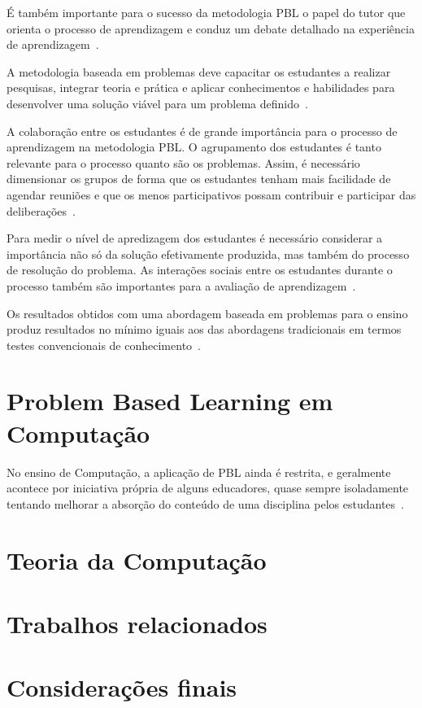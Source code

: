 É também importante para o sucesso da metodologia PBL o
papel do tutor que orienta o processo de aprendizagem
e conduz um debate detalhado na experiência de
aprendizagem~\cite{savery2015overview}.



A metodologia baseada em problemas deve capacitar os estudantes a
realizar pesquisas, integrar teoria e prática e aplicar conhecimentos
e habilidades para desenvolver uma solução viável para
um problema definido~\cite{savery2015overview}.


A colaboração entre os estudantes é de grande importância para o
processo de aprendizagem na metodologia PBL.
O agrupamento dos estudantes é tanto relevante para o processo quanto
são os problemas. Assim, é necessário dimensionar os grupos de forma
que os estudantes tenham mais facilidade de agendar reuniões e que
os menos participativos possam contribuir e participar das
deliberações~\cite{savery2015overview, albanese2010problem}.

Para medir o nível de apredizagem dos estudantes é necessário considerar
a importância não só da solução efetivamente produzida, mas também do
processo de resolução do problema.
As interações sociais entre os estudantes durante
o processo também são importantes para a
avaliação de aprendizagem~\cite{albanese2010problem}.

Os resultados obtidos com uma abordagem baseada em problemas para o ensino
produz resultados no mínimo iguais aos das abordagens tradicionais em
termos testes convencionais de conhecimento~\cite{savery2015overview}.

\section{Problem Based Learning em Computação}
No ensino de Computação, a aplicação de PBL ainda é restrita, e geralmente
acontece por iniciativa própria de alguns educadores,
quase sempre isoladamente tentando melhorar a
absorção do conteúdo de uma disciplina
pelos estudantes~\cite{wood2003problem, o2012practical}.

\section{Teoria da Computação}
\section{Trabalhos relacionados}
\section{Considerações finais}
